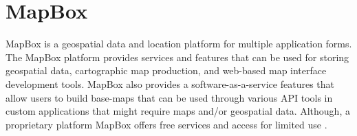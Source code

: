 \section{MapBox}

MapBox is a geospatial data and location platform for multiple application forms.
The MapBox platform provides services and features that can be used for storing geospatial
data,  cartographic map production, and web-based map interface development tools.
MapBox also provides a software-as-a-service features that allow users to build base-maps
that can be used through various API tools in custom applications that might require maps
and/or geospatial data.  Although, a proprietary platform MapBox offers free services and
access for limited use \cite{MapBox.com2018}.
